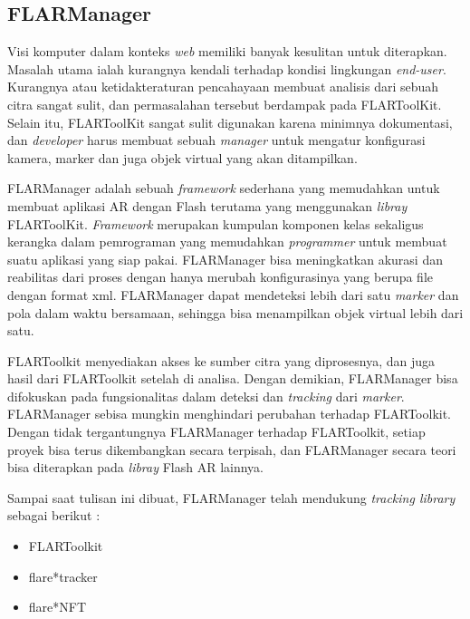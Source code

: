 \subsection {FLARManager}
\label{subsec:FLARManager}
Visi komputer dalam konteks \textit{web} memiliki banyak kesulitan untuk diterapkan. Masalah utama ialah kurangnya kendali terhadap kondisi lingkungan \textit{end-user}. Kurangnya atau ketidakteraturan pencahayaan membuat analisis dari sebuah citra sangat sulit, dan permasalahan tersebut berdampak pada FLARToolKit. Selain itu, FLARToolKit sangat sulit digunakan karena minimnya dokumentasi, dan \textit{developer} harus membuat sebuah \textit{manager} untuk mengatur konfigurasi kamera, marker dan juga objek virtual yang akan ditampilkan. 

FLARManager adalah sebuah \textit{framework} sederhana yang memudahkan untuk membuat aplikasi AR dengan Flash terutama yang menggunakan \textit{libray} FLARToolKit. \textit{Framework} merupakan kumpulan komponen kelas sekaligus kerangka dalam pemrograman yang memudahkan \textit{programmer} untuk membuat suatu aplikasi yang siap pakai. FLARManager bisa meningkatkan akurasi dan reabilitas dari proses dengan hanya merubah konfigurasinya yang berupa file dengan format xml. FLARManager dapat mendeteksi lebih dari satu \textit{marker} dan pola dalam waktu bersamaan, sehingga bisa menampilkan objek virtual lebih dari satu.

FLARToolkit menyediakan akses ke sumber citra yang diprosesnya, dan juga hasil dari FLARToolkit setelah di analisa. Dengan demikian, FLARManager bisa difokuskan pada fungsionalitas dalam deteksi dan \textit{tracking} dari \textit{marker}. FLARManager sebisa mungkin menghindari perubahan terhadap FLARToolkit. Dengan tidak tergantungnya FLARManager terhadap FLARToolkit, setiap proyek bisa terus dikembangkan secara terpisah, dan FLARManager secara teori bisa diterapkan pada \textit{libray} Flash AR lainnya.

Sampai saat tulisan ini dibuat, FLARManager telah mendukung \textit{tracking library} sebagai berikut :
\begin{itemize}
\item FLARToolkit
\item flare*tracker
\item flare*NFT
\end{itemize}

